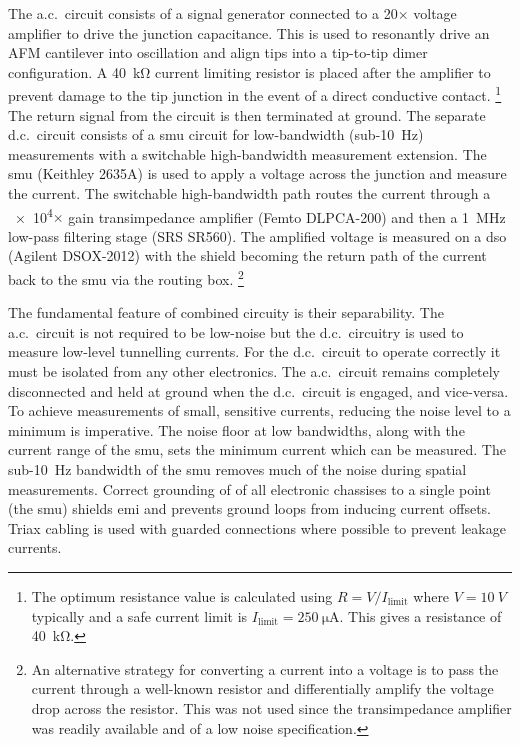 \documentclass{article}
\begin{document}
The a.c.\ circuit consists of a signal generator connected to a 20$\times$ voltage amplifier to drive the junction capacitance. This is used to resonantly drive an AFM cantilever into oscillation and align tips into a tip-to-tip dimer configuration. A \SI{40}{\kilo\ohm} current limiting resistor is placed after the amplifier to prevent damage to the tip junction in the event of a direct conductive contact.%
\footnote{The optimum resistance value is calculated using $R = V/I_{\mathrm{limit}}$ where $V=\SI{10}{V}$ typically and a safe current limit is $I_{\mathrm{limit}}=\SI{250}{\micro\ampere}$. This gives a resistance of \SI{40}{\kilo\ohm}.}
The return signal from the circuit is then terminated at ground. The separate d.c.\ circuit consists of a \gls{smu} circuit for low-bandwidth (sub-\SI{10}{Hz}) measurements with a switchable high-bandwidth measurement extension. The \gls{smu} (Keithley 2635A) is used to apply a voltage across the junction and measure the current. The switchable high-bandwidth path routes the current through a \num{e4}$\times$ gain transimpedance amplifier (Femto DLPCA-200) and then a \SI{1}{MHz} low-pass filtering stage (SRS SR560). The amplified voltage is measured on a \gls{dso} (Agilent DSOX-2012) with the shield becoming the return path of the current back to the \gls{smu} via the routing box.%
\footnote{An alternative strategy for converting a current into a voltage is to pass the current through a well-known resistor and differentially amplify the voltage drop across the resistor. This was not used since the transimpedance amplifier was readily available and of a low noise specification.}

The fundamental feature of combined circuity is their separability. The a.c.\ circuit is not required to be low-noise but the d.c.\ circuitry is used to measure low-level tunnelling currents. For the d.c.\ circuit to operate correctly it must be isolated from any other electronics. The a.c.\ circuit remains completely disconnected and held at ground when the d.c.\ circuit is engaged, and vice-versa.
To achieve measurements of small, sensitive currents, reducing the noise level to a minimum is imperative. The noise floor at low bandwidths, along with the current range of the \gls{smu}, sets the minimum current which can be measured. The sub-\SI{10}{Hz} bandwidth of the \gls{smu} removes much of the noise during spatial measurements. Correct grounding of of all electronic chassises to a single point (the \gls{smu}) shields \gls{emi} and prevents ground loops from inducing current offsets. Triax cabling is used with guarded connections where possible to prevent leakage currents.
\end{document}
